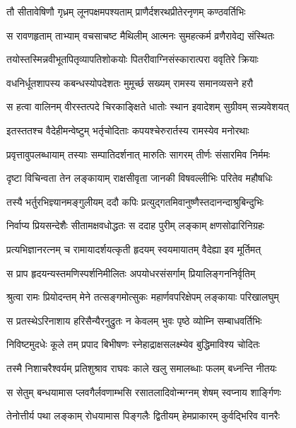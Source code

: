 \twolineshloka
{तौ सीतावेषिणौ गृध्रम् लूनपक्षमपश्यताम्}
{प्राणैर्दशरथप्रीतेरनृणम् कण्ठवर्तिभिः} %

\twolineshloka
{स रावणहृताम् ताभ्याम् वचसाचष्ट मैथिलीम्}
{आत्मनः सुमहत्कर्म व्रणैरावेद्य संस्थितः} %

\twolineshloka
{तयोस्तस्मिन्नवीभूतपितृव्यापतिशोकयोः}
{पितरीवाग्निसंस्कारात्परा ववृतिरे क्रियाः} %

\twolineshloka
{वधनिर्धूतशापस्य कबन्धस्योपदेशतः}
{मुमूर्च्छ सख्यम् रामस्य समानव्यसने हरौ} %

\twolineshloka
{स हत्वा वालिनम् वीरस्तत्पदे चिरकाङ्क्षिते}
{धातोः स्थान इवादेशम् सुग्रीवम् सन्न्यवेशयत्} %

\twolineshloka
{इतस्ततश्च वैदेहीमन्वेष्टुम् भर्तृचोदिताः}
{कपयश्चेरुरार्तस्य रामस्येव मनोरथाः} %

\twolineshloka
{प्रवृत्तावुपलब्धायाम् तस्याः सम्पातिदर्शनात्}
{मारुतिः सागरम् तीर्णः संसारमिव निर्ममः} %

\twolineshloka
{दृष्टा विचिन्वता तेन लङ्कायाम् राक्षसीवृता}
{जानकी विषवल्लीभिः परितेव महौषधिः} %

\twolineshloka
{तस्यै भर्तुरभिज्ञ्यानमङ्गुलीयम् ददौ कपिः}
{प्रत्युद्गतमिवानुष्णैस्तदानन्दाश्रुबिन्दुभिः} %

\twolineshloka
{निर्वाप्य प्रियसन्देशैः सीतामक्षवधोद्धतः}
{स ददाह पुरीम् लङ्काम् क्षणसोढारिनिग्रहः} %

\twolineshloka
{प्रत्यभिज्ञानरत्नम् च रामायादर्शयत्कृती}
{हृदयम् स्वयमायातम् वैदेह्या इव मूर्तिमत्} %

\twolineshloka
{स प्राप हृदयन्यस्तमणिस्पर्शनिमीलितः}
{अपयोधरसंसर्गाम् प्रियालिङ्गननिर्वृतिम्} %

\twolineshloka
{श्रुत्वा रामः प्रियोदन्तम् मेने तत्सङ्गमोत्सुकः}
{महार्णवपरिक्षेपम् लङ्कायाः परिखालघुम्} %

\twolineshloka
{स प्रतस्थेऽरिनाशाय हरिसैन्यैरनुद्रुतः}
{न केवलम् भुवः पृष्ठे व्योम्नि सम्बाधवर्तिभिः} %

\twolineshloka
{निविष्टमुदधेः कूले तम् प्रपाद बिभीषणः}
{स्नेहाद्राक्षसलक्ष्म्येव बुद्धिमाविश्य चोदितः} %

\twolineshloka
{तस्मै निशाचरैश्वर्यम् प्रतिशुश्राव राघवः}
{काले खलु समालब्धाः फलम् बध्नन्ति नीतयः} %

\twolineshloka
{स सेतुम् बन्धयामास प्लवगैर्लवणाम्भसि}
{रसातलादिवोन्मग्नम् शेषम् स्वप्नाय शार्ङ्गिणः} %

\twolineshloka
{तेनोत्तीर्य पथा लङ्काम् रोधयामास पिङ्गलैः}
{द्वितीयम् हेमप्राकारम् कुर्वद्भिरिव वानरैः} %

